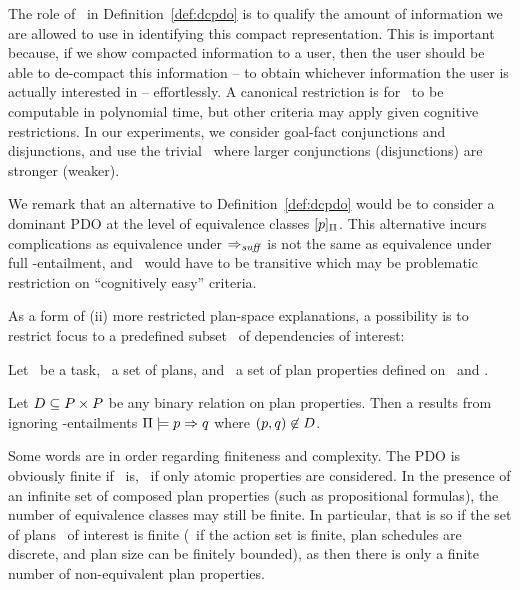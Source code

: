 The role of \entailsuff\ in Definition~\ref{def:dcpdo} is to qualify
the amount of information we are allowed to use in identifying this
compact representation. This is important because, if we show
compacted information to a user, then the user should be able to
de-compact this information -- to obtain whichever information the
user is actually interested in -- effortlessly. A canonical
restriction is for \entailsuff\ to be computable in polynomial time,
but other criteria may apply given cognitive restrictions. In our
experiments, we consider goal-fact conjunctions and disjunctions, and
use the trivial \entailsuff\ where larger conjunctions (disjunctions)
are stronger (weaker).

We remark that an alternative to Definition~\ref{def:dcpdo} would be
to consider a dominant PDO at the level of equivalence classes
$[p]_{\Pi}$. This alternative incurs complications as
equivalence under $\Rightarrow_{\mathit{suff}}$ is not the same as equivalence under
full \plans-entailment, and \entailsuff\ would have to be transitive
which may be problematic restriction on ``cognitively easy'' criteria.
%

As a form of (ii) more restricted plan-space explanations, a
possibility is to restrict focus to a predefined subset \deps\ of
dependencies of interest:

\begin{definition}
Let \task\ be a task, \plans\ a set of plans, and \props\ a set of
plan properties defined on \task\ and \plans.

Let $D \subseteq P \times P$ be any binary relation on
plan properties. Then a  results from
ignoring \plans-entailments $\Pi \models p \Rightarrow q$ where
$(p,q) \not\in D$.
\end{definition}

Some words are in order regarding finiteness and complexity. The PDO
is obviously finite if \props\ is, \eg\ if only atomic properties are
considered. In the presence of an infinite set of composed plan
properties (such as propositional formulas), the number of equivalence
classes may still be finite. In particular, that is so if the set of
plans \plans\ of interest is finite (\eg\ if the action set is finite,
plan schedules are discrete, and plan size can be finitely bounded),
as then there is only a finite number of non-equivalent plan
properties.
%
%

